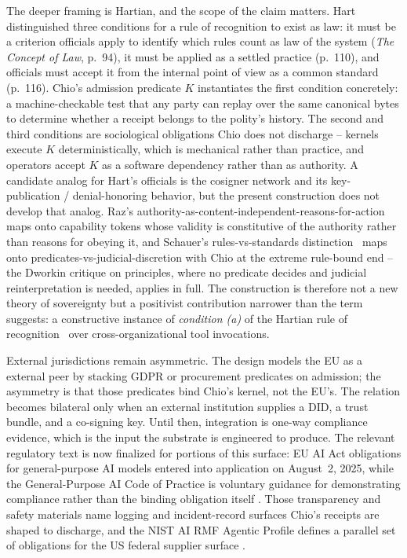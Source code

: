The deeper framing is Hartian, and the scope of the claim matters. Hart distinguished three conditions for a rule of recognition to exist as law: it must be a criterion officials apply to identify which rules count as law of the system (\textit{The Concept of Law}, p.~94), it must be applied as a settled practice (p.~110), and officials must accept it from the internal point of view as a common standard (p.~116). Chio's admission predicate $K$ instantiates the first condition concretely: a machine-checkable test that any party can replay over the same canonical bytes to determine whether a receipt belongs to the polity's history. The second and third conditions are sociological obligations Chio does not discharge -- kernels execute $K$ deterministically, which is mechanical rather than practice, and operators accept $K$ as a software dependency rather than as authority. A candidate analog for Hart's officials is the cosigner network and its key-publication / denial-honoring behavior, but the present construction does not develop that analog. Raz's authority-as-content-independent-reasons-for-action~\cite{razAuthority} maps onto capability tokens whose validity is constitutive of the authority rather than reasons for obeying it, and Schauer's rules-vs-standards distinction~\cite{schauerRules} maps onto predicates-vs-judicial-discretion with Chio at the extreme rule-bound end -- the Dworkin critique on principles, where no predicate decides and judicial reinterpretation is needed, applies in full. The construction is therefore not a new theory of sovereignty but a positivist contribution narrower than the term suggests: a constructive instance of \emph{condition (a)} of the Hartian rule of recognition~\cite{hartLaw} over cross-organizational tool invocations.

External jurisdictions remain asymmetric. The design models the EU as a  external peer by stacking GDPR or procurement predicates on admission; the asymmetry is that those predicates bind Chio's kernel, not the EU's. The relation becomes bilateral only when an external institution supplies a DID, a trust bundle, and a co-signing key. Until then, integration is one-way compliance evidence, which is the input the substrate is engineered to produce. The relevant regulatory text is now finalized for portions of this surface: EU AI Act obligations for general-purpose AI models entered into application on August~2, 2025, while the General-Purpose AI Code of Practice is voluntary guidance for demonstrating compliance rather than the binding obligation itself \cite{euAIActGPAICode}. Those transparency and safety materials name logging and incident-record surfaces Chio's receipts are shaped to discharge, and the NIST AI RMF Agentic Profile defines a parallel set of obligations for the US federal supplier surface \cite{nistAIRMFAgentic}.

